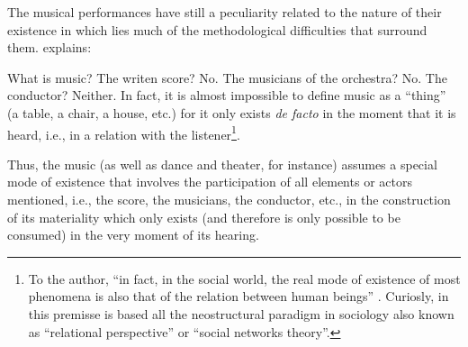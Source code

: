 \documentclass[a4paper, 12pt, openright, oneside, german, french, brazil, english, article]{abntex2}
\begin{document}
	The musical performances have still a peculiarity related to the nature of their existence in which lies much of the methodological difficulties that surround them.  explains:
	
	\begin{citacao}
		What is music? The writen score? No. The musicians of the orchestra? No. The conductor? Neither. In fact, it is almost impossible to define music as a ``thing'' (a table, a chair, a house, etc.) for it only exists \textit{de facto} in the moment that it is heard, i.e., in a relation with the listener\footnote{To the author, ``in fact, in the social world, the real mode of existence of most phenomena is also that of the relation between human beings'' \cite[p. 110]{tolila2007cultura}. Curiosly, in this premisse is based all the neostructural paradigm in sociology also known as ``relational perspective'' or ``social networks theory''.}. \cite[p. 109]{tolila2007cultura}
	\end{citacao}
	
	

	Thus, the music (as well as dance and theater, for instance) assumes a special mode of existence that involves the participation of all elements or actors mentioned, i.e., the score, the musicians, the conductor, etc., in the construction of its materiality which only exists (and therefore is only possible to be consumed) in the very moment of its hearing.	
	
\end{document}
